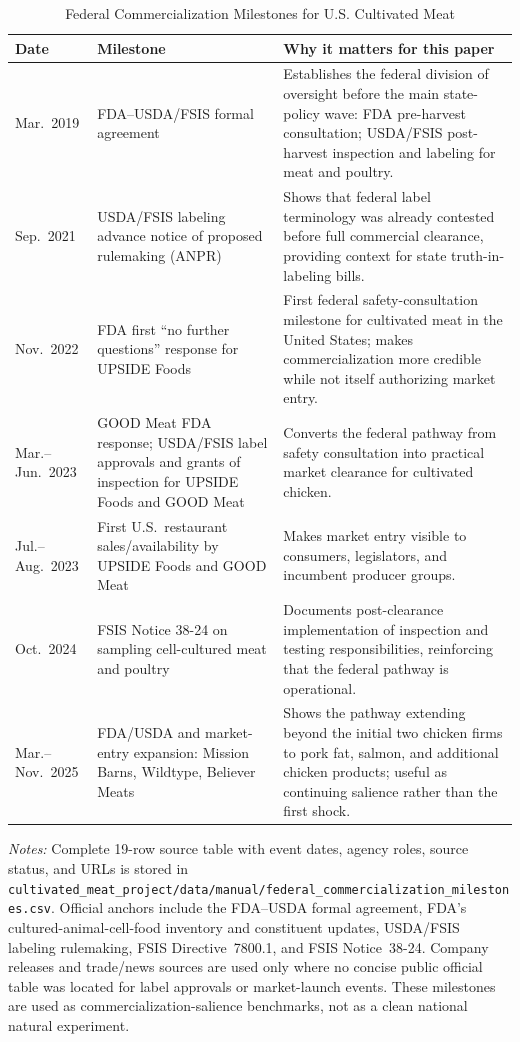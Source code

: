 \documentclass[12pt]{article}
\begin{document}
\begin{table}[htbp]
\centering
\begin{threeparttable}
\caption{Federal Commercialization Milestones for U.S. Cultivated Meat}
\label{tab:federal_milestones}
\small
\begin{tabularx}{\textwidth}{p{}p{}Y}
\toprule
Date & Milestone & Why it matters for this paper \\
\midrule
Mar.\ 2019 & FDA--USDA/FSIS formal agreement & Establishes the federal division of oversight before the main state-policy wave: FDA pre-harvest consultation; USDA/FSIS post-harvest inspection and labeling for meat and poultry. \\
\addlinespace
Sep.\ 2021 & USDA/FSIS labeling advance notice of proposed rulemaking (ANPR) & Shows that federal label terminology was already contested before full commercial clearance, providing context for state truth-in-labeling bills. \\
\addlinespace
Nov.\ 2022 & FDA first ``no further questions'' response for UPSIDE Foods & First federal safety-consultation milestone for cultivated meat in the United States; makes commercialization more credible while not itself authorizing market entry. \\
\addlinespace
Mar.--Jun.\ 2023 & GOOD Meat FDA response; USDA/FSIS label approvals and grants of inspection for UPSIDE Foods and GOOD Meat & Converts the federal pathway from safety consultation into practical market clearance for cultivated chicken. \\
\addlinespace
Jul.--Aug.\ 2023 & First U.S.\ restaurant sales/availability by UPSIDE Foods and GOOD Meat & Makes market entry visible to consumers, legislators, and incumbent producer groups. \\
\addlinespace
Oct.\ 2024 & FSIS Notice 38-24 on sampling cell-cultured meat and poultry & Documents post-clearance implementation of inspection and testing responsibilities, reinforcing that the federal pathway is operational. \\
\addlinespace
Mar.--Nov.\ 2025 & FDA/USDA and market-entry expansion: Mission Barns, Wildtype, Believer Meats & Shows the pathway extending beyond the initial two chicken firms to pork fat, salmon, and additional chicken products; useful as continuing salience rather than the first shock. \\
\bottomrule
\end{tabularx}
\begin{tablenotes}[flushleft]
\footnotesize
\item \textit{Notes:} Complete 19-row source table with event dates, agency roles, source status, and URLs is stored in \texttt{cultivated\_meat\_project/data/manual/federal\_commercialization\_milestones.csv}.  Official anchors include the FDA--USDA formal agreement, FDA's cultured-animal-cell-food inventory and constituent updates, USDA/FSIS labeling rulemaking, FSIS Directive~7800.1, and FSIS Notice~38-24.  Company releases and trade/news sources are used only where no concise public official table was located for label approvals or market-launch events.  These milestones are used as commercialization-salience benchmarks, not as a clean national natural experiment.

\end{tablenotes}
\end{threeparttable}
\end{table}
\end{document}
